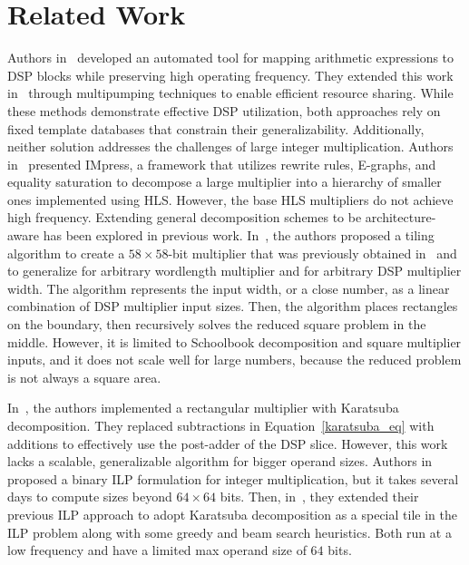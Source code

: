 \documentclass[conference]{IEEEtran}
\begin{document}
\section{Related Work}
Authors in~\cite{fahmyMapDSPMaxPerformance2016} developed an automated tool for mapping arithmetic expressions to DSP blocks while preserving high operating frequency.
They extended this work in~\cite{fahmyMultipumpingDSP2017}  through multipumping techniques to enable efficient resource sharing.
While these methods demonstrate effective DSP utilization, both approaches rely on fixed template databases that constrain their generalizability. 
Additionally, neither solution addresses the challenges of large integer multiplication.
Authors in~\cite{zhangIMpressLargeInteger2022} presented IMpress, a framework that utilizes rewrite rules, E-graphs, and equality saturation to decompose a large multiplier into a hierarchy of smaller ones implemented using HLS.
However, the base HLS multipliers do not achieve high frequency.
Extending general decomposition schemes to be architecture-aware has been explored in previous work. 
In~\cite{royTileMultiplicationEfficient2014}, the authors proposed a tiling algorithm to create a $58\times58$-bit multiplier
that was previously obtained in~\cite{pascaLargeMultipliersLessDSP2009} and to generalize for arbitrary wordlength multiplier and for arbitrary DSP multiplier width.
The algorithm represents the input width, or a close number, as a linear combination of DSP multiplier input sizes. 
Then, the algorithm places rectangles on the boundary, then recursively solves the reduced square problem in the middle.
However, it is limited to Schoolbook decomposition and square multiplier inputs, and it does not scale well for large numbers, because the reduced problem is not always a square area. 



In~\cite{kummKaratsubaRectangularMultipliers2018}, the authors implemented a rectangular multiplier with Karatsuba decomposition. 
They replaced subtractions in Equation~\ref{karatsuba_eq} with additions to effectively use the post-adder of the DSP slice. 
However, this work lacks a scalable, generalizable algorithm for bigger operand sizes.
Authors in~\cite{kummTilingILP2017} proposed a binary ILP formulation for integer multiplication, but it takes several days to compute sizes beyond $64\times64$ bits.
Then, in~\cite{kummTilingHeuristics2020}, they extended their previous ILP approach to adopt Karatsuba decomposition as a special tile in the ILP problem along with some greedy and beam search heuristics.
Both run at a low frequency and have a limited max operand size of $64$ bits.
\end{document}

